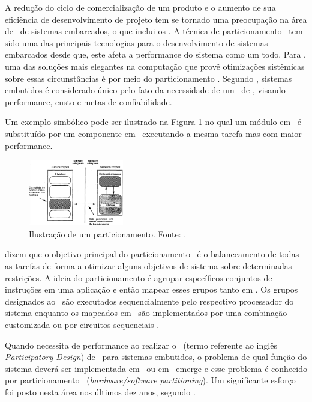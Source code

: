 	A redução do ciclo de comercialização de um produto e o aumento de sua eficiência de desenvolvimento de projeto tem se tornado uma preocupação na área de \design\ de sistemas embarcados, o que inclui os \wearables.
	A técnica de particionamento \hs\ tem sido uma das principais tecnologias para o desenvolvimento de sistemas embarcados desde que, este afeta a performance do sistema como um todo. Para \cite{Hassine2017}, uma das soluções mais elegantes na computação que provê otimizações sistêmicas sobre essas circunstâncias é por meio do particionamento \hs.
	Segundo \cite{Wolf1994}, sistemas embutidos é considerado único pelo fato da necessidade de um \codesign\ de \hs, visando performance, custo e metas de confiabilidade.

	Um exemplo simbólico pode ser ilustrado na Figura \ref{fig:rt-edwards_partitioning} no qual um módulo em \software\ é substituído por um componente em \hardware\ executando a mesma tarefa mas com maior performance.

	\begin{figure}[!b] \centering
		\includegraphics[width=0.37\textwidth]{img/rt-edwards_partitioning.png}
		\caption{Ilustração de um particionamento. Fonte: \cite{Edwards1994}.}
		\label{fig:rt-edwards_partitioning}
	\end{figure}

	\cite{Hidalgo1997} dizem que o objetivo principal do particionamento \hs\ é o balanceamento de todas as tarefas de forma a otimizar alguns objetivos de sistema sobre determinadas restrições.
	A ideia do particionamento é agrupar específicos conjuntos de instruções em uma aplicação e então mapear esses grupos tanto em \hs.
	Os grupos designados ao \software\ são executados sequencialmente pelo respectivo processador do sistema enquanto os mapeados em \hardware\ são implementados por uma combinação customizada ou por circuitos sequenciais \cite{Sass2010}.

	Quando necessita de performance ao realizar o \codesign\ (termo referente ao inglês \textit{Participatory Design}) de \hs\ para sistemas embutidos, o problema de qual função do sistema deverá ser implementada em \hardware\ ou em \software\ emerge e esse problema é conhecido por particionamento \hs\ (\textit{hardware/software partitioning}).
	Um significante esforço foi posto nesta área nos últimos dez anos, segundo \cite{Trindade2016}.


